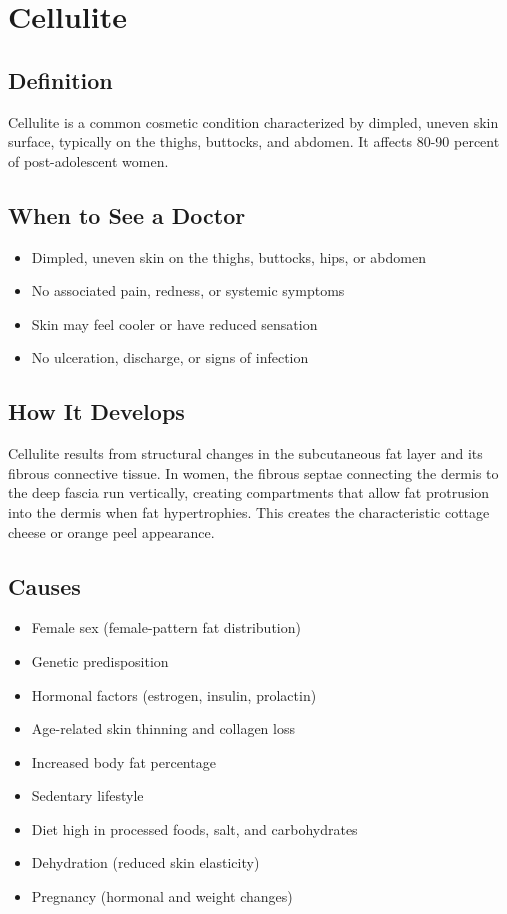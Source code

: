 \chapter{Cellulite}

\section*{Definition}
Cellulite is a common cosmetic condition characterized by dimpled, uneven skin surface, typically on the thighs, buttocks, and abdomen. It affects 80-90 percent of post-adolescent women.

\section*{When to See a Doctor}
\begin{itemize}
\item Dimpled, uneven skin on the thighs, buttocks, hips, or abdomen
\item No associated pain, redness, or systemic symptoms
\item Skin may feel cooler or have reduced sensation
\item No ulceration, discharge, or signs of infection
\end{itemize}

\section*{How It Develops}
Cellulite results from structural changes in the subcutaneous fat layer and its fibrous connective tissue. In women, the fibrous septae connecting the dermis to the deep fascia run vertically, creating compartments that allow fat protrusion into the dermis when fat hypertrophies. This creates the characteristic cottage cheese or orange peel appearance.

\section*{Causes}
\begin{itemize}
\item Female sex (female-pattern fat distribution)
\item Genetic predisposition
\item Hormonal factors (estrogen, insulin, prolactin)
\item Age-related skin thinning and collagen loss
\item Increased body fat percentage
\item Sedentary lifestyle
\item Diet high in processed foods, salt, and carbohydrates
\item Dehydration (reduced skin elasticity)
\item Pregnancy (hormonal and weight changes)
\end{itemize}

